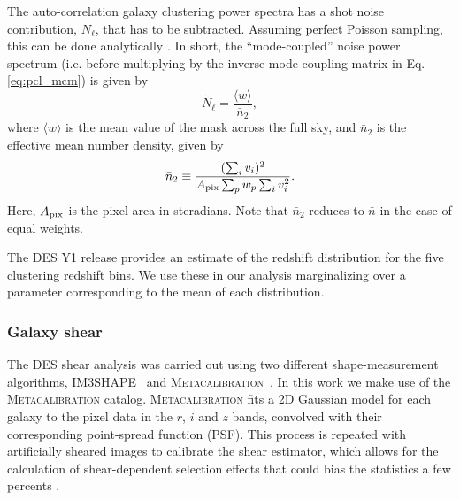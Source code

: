 \documentclass[a4paper,11pt]{article}
\newcommand{\mean}[1]{\bar{#1}}
\newcommand{\mcal}{\textsc{Metacalibration}\xspace}
\begin{document}
        The auto-correlation galaxy clustering power spectra has a shot noise contribution, $N_\ell$, that has to be subtracted. Assuming perfect Poisson sampling, this can be done analytically \cite{1912.08209}. In short, the ``mode-coupled'' noise power spectrum (i.e. before multiplying by the inverse mode-coupling matrix in Eq. \ref{eq:pcl_mcm}) is given by
        \begin{equation}\label{eq:des.gc.nl}
          \tilde{N}_\ell = \frac{\langle w\rangle}{\mean{n}_2},
        \end{equation}
        where $\langle w\rangle$ is the mean value of the mask across the full sky, and $\mean{n}_2$ is the effective mean number density, given by
        \begin{equation}
          \mean{n}_2\equiv\frac{(\sum_i v_i)^2}{A_{\rm pix}\sum_p w_p\sum_i v_i^2}.
        \end{equation}
        Here, $A_{\rm pix}$ is the pixel area in steradians. Note that $\mean{n}_2$ reduces to $\mean{n}$ in the case of equal weights.

        The DES Y1 release provides an estimate of the redshift distribution for the five clustering redshift bins. We use these in our analysis marginalizing over a parameter corresponding to the mean of each distribution.

      \subsubsection{Galaxy shear}\label{sssec:data.DES.sh}
        The DES shear analysis was carried out using two different shape-measurement algorithms, \textsc{IM3SHAPE}~\cite{1302.0183} and \mcal~\cite{1702.02601}. In this work we make use of the \mcal catalog. \mcal fits a 2D Gaussian model for each galaxy to the pixel data in the $r$, $i$ and $z$ bands, convolved with their corresponding point-spread function (PSF). This process is repeated with artificially sheared images to calibrate the shear estimator, which allows for the calculation of shear-dependent selection effects that could bias the statistics a few percents \cite{1708.01533,1708.01537,1708.01538,1702.02601}.
        
\end{document}

